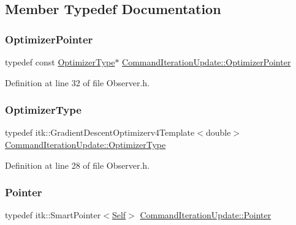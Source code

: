 \subsection{Member Typedef Documentation}
\mbox{\label{class_command_iteration_update_aed2829c5e03b1f7b5e9c862f00f493af}} 
\subsubsection{\texorpdfstring{Optimizer\+Pointer}{OptimizerPointer}}
{\footnotesize\ttfamily typedef const \hyperlink{class_command_iteration_update_aa3ff4b0f0b936c866d1bed92cacaf6a1}{Optimizer\+Type}$\ast$ \hyperlink{class_command_iteration_update_aed2829c5e03b1f7b5e9c862f00f493af}{Command\+Iteration\+Update\+::\+Optimizer\+Pointer}}



Definition at line 32 of file Observer.\+h.

\mbox{\label{class_command_iteration_update_aa3ff4b0f0b936c866d1bed92cacaf6a1}} 
\subsubsection{\texorpdfstring{Optimizer\+Type}{OptimizerType}}
{\footnotesize\ttfamily typedef itk\+::\+Gradient\+Descent\+Optimizerv4\+Template$<$double$>$ \hyperlink{class_command_iteration_update_aa3ff4b0f0b936c866d1bed92cacaf6a1}{Command\+Iteration\+Update\+::\+Optimizer\+Type}}



Definition at line 28 of file Observer.\+h.

\mbox{\label{class_command_iteration_update_a07d09836044e93fd8693d947d77a58a5}} 
\subsubsection{\texorpdfstring{Pointer}{Pointer}}
{\footnotesize\ttfamily typedef itk\+::\+Smart\+Pointer$<$\hyperlink{class_command_iteration_update_a82da0970ef8c14141f85f3465f08242e}{Self}$>$ \hyperlink{class_command_iteration_update_a07d09836044e93fd8693d947d77a58a5}{Command\+Iteration\+Update\+::\+Pointer}}



